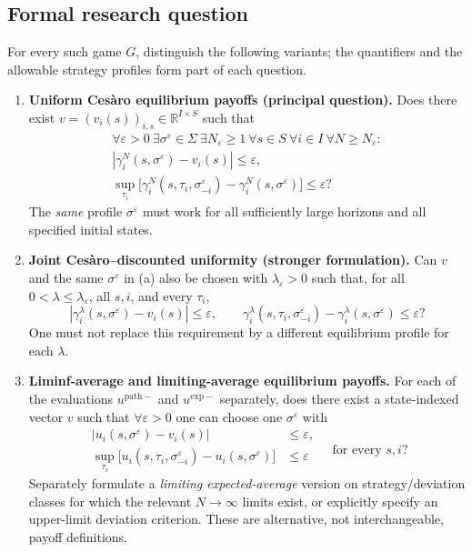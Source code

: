 \documentclass[11pt,a4paper]{article}
\newcommand{\R}{\mathbb R}
\begin{document}
\subsection*{Formal research question}

For every such game $G$, distinguish the following variants; the
quantifiers and the allowable strategy profiles form part of each
question.

\begin{enumerate}[label=\textbf{(\alph*)},leftmargin=2.5em]
	\item \textbf{Uniform Ces\`aro equilibrium payoffs (principal question).}
	Does there exist $v=(v_i(s))_{i,s}\in\R^{I\times S}$ such that
	\[
	\begin{gathered}
		\forall\varepsilon>0\ \exists\sigma^\varepsilon\in\Sigma\ 
		\exists N_\varepsilon\ge1\ \forall s\in S\ \forall i\in I\ 
		\forall N\ge N_\varepsilon:\\[-2pt]
		\left|\gamma_i^N(s,\sigma^\varepsilon)-v_i(s)\right|\le\varepsilon,\\
		\sup_{\tau_i}\bigl[\gamma_i^N(s,\tau_i,\sigma_{-i}^\varepsilon)
		-\gamma_i^N(s,\sigma^\varepsilon)\bigr]
		\le\varepsilon?
	\end{gathered}
	\]
	The \emph{same} profile $\sigma^\varepsilon$ must work for all
	sufficiently large horizons and all specified initial states.
	
	\item \textbf{Joint Ces\`aro--discounted uniformity (stronger formulation).}
	Can $v$ and the same $\sigma^\varepsilon$ in (a) also be chosen
	with $\lambda_\varepsilon>0$ such that, for all
	$0<\lambda\le\lambda_\varepsilon$, all $s,i$, and every $\tau_i$,
	\[
	\left|\gamma_i^\lambda(s,\sigma^\varepsilon)-v_i(s)\right|
	\le\varepsilon,\qquad
	\gamma_i^\lambda(s,\tau_i,\sigma_{-i}^\varepsilon)
	-\gamma_i^\lambda(s,\sigma^\varepsilon)\le\varepsilon?
	\]
	One must not replace this requirement by a different equilibrium
	profile for each $\lambda$.
	
	\item \textbf{Liminf-average and limiting-average equilibrium payoffs.}
	For each of the evaluations $u^{\mathrm{path}-}$ and
	$u^{\mathrm{exp}-}$ separately, does there exist a state-indexed vector
	$v$ such that $\forall\varepsilon>0$ one can choose one
	$\sigma^\varepsilon$ with
	\[
	\begin{aligned}
		\left|u_i(s,\sigma^\varepsilon)-v_i(s)\right|&\le\varepsilon,\\
		\sup_{\tau_i}\bigl[u_i(s,\tau_i,\sigma_{-i}^\varepsilon)
		-u_i(s,\sigma^\varepsilon)\bigr]
		&\le\varepsilon
	\end{aligned}
	\quad\text{for every }s,i?
	\]
	Separately formulate a \emph{limiting expected-average} version on
	strategy/deviation classes for which the relevant $N\to\infty$ limits
	exist, or explicitly specify an upper-limit deviation criterion.
	These are alternative, not interchangeable, payoff definitions.
	

\end{enumerate}
\end{document}
